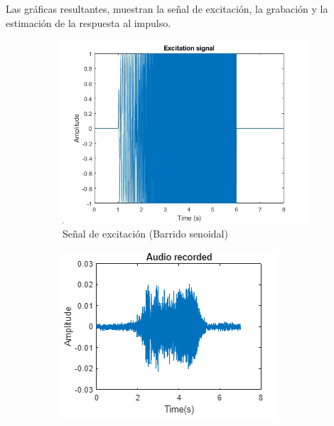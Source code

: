 Las gráficas resultantes, muestran la señal de excitación, la grabación y la estimación de la respuesta al impulso.
\begin{figure}[!htb]
    \centering
     \begin{subfigure}{0.3\textwidth}
        \centering
        \includegraphics[width=\linewidth]{imagenes/ExcitationSignal_RIR_Measurement.jpg}
        \caption{\footnotesize Señal de excitación (Barrido senoidal)}
        \label{fig:sub1}
    \end{subfigure}
    \hfill
    \begin{subfigure}{0.3\textwidth}
        \centering
        \includegraphics[width=\linewidth]{imagenes/AudioFromDevice_RIR_Measurement.png}

\end{subfigure}
\end{figure}
